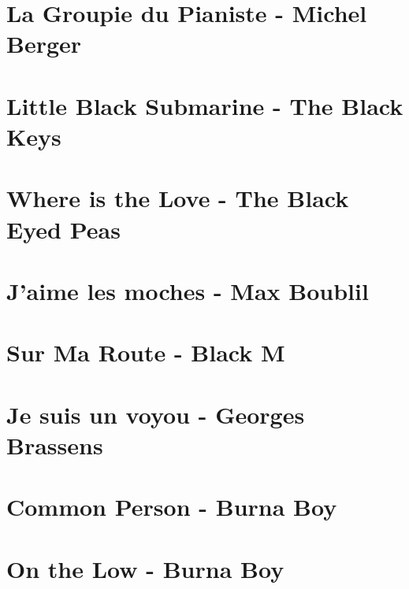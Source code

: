 \documentclass[11pt]{article}
\begin{document}
\section{La Groupie du Pianiste - Michel Berger}


\section{Little Black Submarine - The Black Keys}
\begin{guitar}

\end{guitar}



\section{Where is the Love - The Black Eyed Peas}


\section{J'aime les moches - Max Boublil}


\section{Sur Ma Route - Black M}
\begin{guitar}

\end{guitar}

\section{Je suis un voyou - Georges Brassens}
\begin{guitar}

\end{guitar}

\section{Common Person - Burna Boy}


\section{On the Low - Burna Boy}

\end{document}
